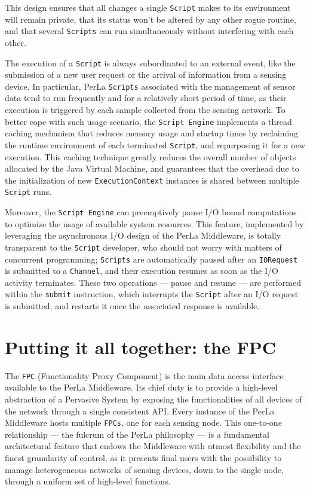 This design ensures that all changes a single \texttt{Script} makes to its
environment will remain private, that its status won't be altered by any
other rogue routine, and that several \texttt{Scripts} can run simultaneously
without interfering with each other.

The execution of a \texttt{Script} is always subordinated to an external event,
like the submission of a new user request or the arrival of information from a
sensing device. In particular, PerLa \texttt{Scripts} associated with the
management of sensor data tend to run frequently and for a relatively short
period of time, as their execution is triggered by each sample collected from
the sensing network. To better cope with such usage scenario, the
\texttt{Script Engine} implements a thread caching mechanism that reduces
memory usage and startup times by reclaiming the runtime environment of each
terminated \texttt{Script}, and repurposing it for a new execution. This
caching technique greatly reduces the overall number of objects allocated by
the Java Virtual Machine, and guarantees that the overhead due to the
initialization of new \texttt{ExecutionContext} instances is shared between
multiple \texttt{Script} runs.

Moreover, the \texttt{Script Engine} can preemptively pause I/O bound
computations to optimize the usage of available system resources. This feature,
implemented by leveraging the asynchronous I/O design of the PerLa Middleware,
is totally transparent to the \texttt{Script} developer, who should not worry
with matters of concurrent programming; \texttt{Scripts} are automatically
paused after an \texttt{IORequest} is submitted to a \texttt{Channel}, and
their execution resumes as soon as the I/O activity terminates. These
two operations --- pause and resume --- are performed within the
\texttt{submit} instruction, which interrupts the \texttt{Script} after
an I/O request is submitted, and restarts it once the associated response is
available.


\section{Putting it all together: the FPC}

The \texttt{FPC} (Functionality Proxy Component) is the main data access
interface available to the PerLa Middleware. Its chief duty is to provide a
high-level abstraction of a Pervasive System by exposing the functionalities of
all devices of the network through a single consistent API. Every instance of
the PerLa Middleware hosts multiple \texttt{FPCs}, one for each sensing node.
This one-to-one relationship --- the fulcrum of the PerLa philosophy --- is a
fundamental architectural feature that endows the Middleware with utmost
flexibility and the finest granularity of control, as it presents final users
with the possibility to manage heterogeneous networks of sensing devices, down
to the single node, through a uniform set of high-level functions.

